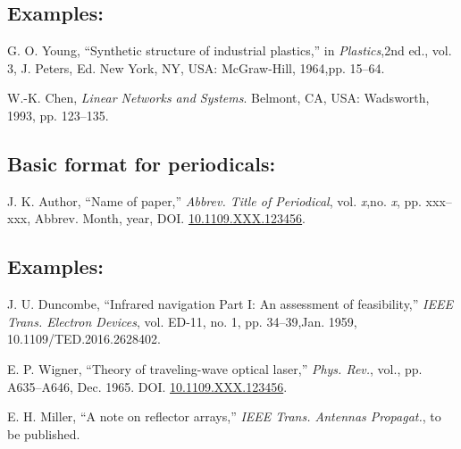 \documentclass[journal]{IEEEtai}
\begin{document}
\subsection*{Examples:}
\def\refname{}
\begin{thebibliography}{34}\vspace*{-12pt}

\bibitem{}G. O. Young, ``Synthetic structure of industrial plastics,'' in {\em Plastics},\break 2nd ed., vol. 3, J. Peters, Ed. New York, NY, USA: McGraw-Hill, 1964,\break pp. 15--64.

\bibitem{}W.-K. Chen, {\it Linear Networks and Systems}. Belmont, CA, USA: Wadsworth, 1993, pp. 123--135.

\end{thebibliography}

\subsection*{Basic format for periodicals:}\vspace*{-12pt}

\begin{thebibliography}{34}
\item[]
J. K. Author, ``Name of paper,'' {\it Abbrev. Title of Periodical}, vol. {\it x},\break   no. {\it x}, pp. xxx--xxx, Abbrev. Month, year, DOI. \href{https://dx.doi.org/10.1109.XXX.123456}{10.1109.XXX.123456}.
\end{thebibliography}


\subsection*{Examples:}\vspace*{-12pt}

\begin{thebibliography}{34}
\setcounter{enumiv}{2}

\bibitem{}J. U. Duncombe, ``Infrared navigation Part I: An assessment of feasibility,'' {\em IEEE Trans. Electron Devices}, vol. ED-11, no. 1, pp. 34--39,\break Jan. 1959, 10.1109/TED.2016.2628402.

\bibitem{}E. P. Wigner, ``Theory of traveling-wave optical laser,''
{\em Phys. Rev.},  vol., pp. A635--A646, Dec. 1965. DOI. \href{https://dx.doi.org/10.1109.XXX.123456}{10.1109.XXX.123456}.

\bibitem{}E. H. Miller, ``A note on reflector arrays,'' {\em IEEE Trans. Antennas Propagat.}, to be published.
\end{thebibliography}
\end{document}
